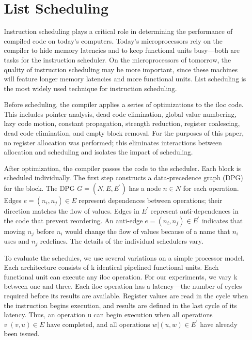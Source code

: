 \newpage


\section{List Scheduling}

Instruction scheduling\cite{cooper1998experimental} plays a critical role in determining the performance of compiled code on today’s
computers. Today’s microprocessors rely on the compiler to hide memory latencies and to keep functional
units busy—both are tasks for the instruction scheduler. On the microprocessors of tomorrow, the quality
of instruction scheduling may be more important, since these machines will feature longer memory latencies
and more functional units. List scheduling is the most widely used technique for instruction scheduling.


Before scheduling, the compiler applies a series of optimizations to the iloc code. This includes pointer
analysis, dead code elimination, global value numbering, lazy code motion, constant propagation, strength
reduction, register coalescing, dead code elimination, and empty block removal. For the purposes of this
paper, no register allocation was performed; this eliminates interactions between allocation and scheduling
and isolates the impact of scheduling.

After optimization, the compiler passes the code to the scheduler. Each block is scheduled individually.
The first step constructs a data-precedence graph (DPG) for the block. The DPG $G = (N, E, E^\prime)$ has a node
 $n \in N$  for each operation. Edges $e = (n_i, n_j) \in E$ represent dependences between operations; their direction
matches the flow of values. Edges in $E^\prime$ represent anti-dependences in the code that prevent reordering. An
anti-edge $e = (n_i, n_j) \in E^\prime$
indicates that moving $n_j$ before $n_i$ would change the flow of values because of
a name that $n_i$ uses and $n_j$ redefines. The details of the individual schedulers vary.

To evaluate the schedules, we use several variations on a simple processor model. Each architecture
consists of k identical pipelined functional units. Each functional unit can execute any iloc operation. For
our experiments, we vary k between one and three. Each iloc operation has a latency—the number of cycles
required before its results are available. Register values are read in the cycle when the instruction begins
execution, and results are defined in the last cycle of its latency. Thus, an operation u can begin execution
when all operations $v |(v, u) \in E$ have completed, and all operations $w |(u, w) \in E^\prime$ have already been issued.



